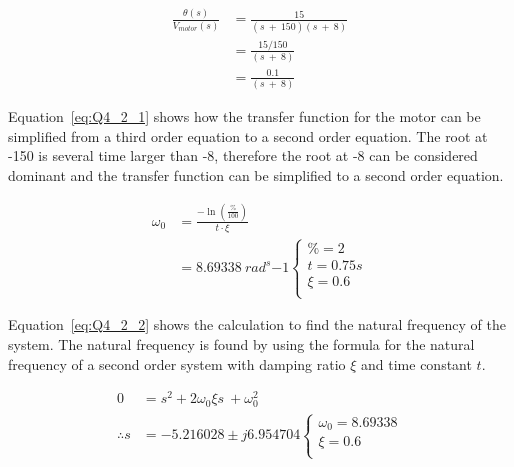 \begin{equation}
	\begin{split}
		\frac{\theta\left(s\right)}{V_{motor}\left(s\right)} &= \frac{15}{\left(s\ +\ 150\right)\left(s\ +\ 8\right)}\\
		&= \frac{15/150}{\left(s\ +\ 8\right)}\\
        &= \frac{0.1}{\left(s\ +\ 8\right)}
	\end{split}\label{eq:Q4_2_1}
\end{equation}

Equation~\eqref{eq:Q4_2_1} shows how the transfer function for the motor can be simplified from a third order equation to a second order equation. The root at -150 is several time larger than -8, therefore the root at -8 can be considered dominant and the transfer function can be simplified to a second order equation.

\begin{equation}
    \begin{split}
        \omega_{0} &= \frac{-\ln(\frac{\%}{100})}{t\cdot\xi}\\
        &=8.69338\ rad^s{-1}    \begin{cases}
            \%=2 \\
            t=0.75s \\
            \xi=0.6\\
        \end{cases}
    \end{split}\label{eq:Q4_2_2}
\end{equation}

Equation~\eqref{eq:Q4_2_2} shows the calculation to find the natural frequency of the system. The natural frequency is found by using the formula for the natural frequency of a second order system with damping ratio $\xi$ and time constant $t$.

\begin{equation}
    \begin{split}
        0&=s^{2}+2\omega_{0}\xi s\ +\omega_{0}^{2}\\
        \therefore s&=-5.216028\pm j6.954704
        \begin{cases}
            \omega_0 = 8.69338 \\
            \xi = 0.6 \\
        \end{cases}
    \end{split}\label{eq:Q4_2_3}
    \end{equation}

